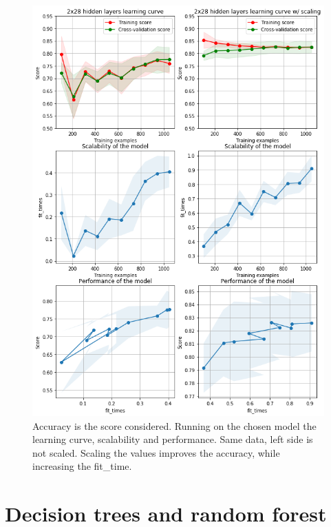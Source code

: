 \documentclass{article}
\begin{document}
\begin{figure}[]
	\includegraphics[width=\textwidth,height=\textheight,keepaspectratio]{plot-nn-learningcurve.png}
	\caption{Accuracy is the score considered. Running on the chosen model the learning curve, scalability and performance. Same data, left side is not scaled. Scaling the values improves the accuracy, while increasing the fit\_time. }
	\label{figure:graph-nn-scalevsnoscale}
\end{figure}




\section{Decision trees and random forest}
\end{document}
